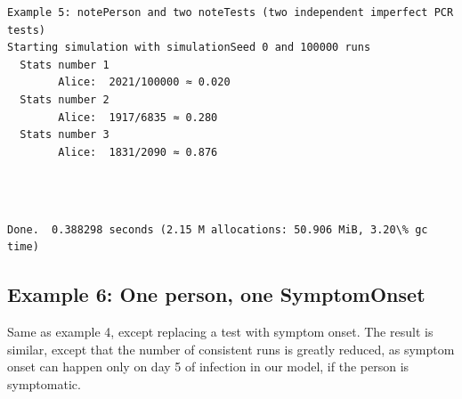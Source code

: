 \documentclass[11pt]{article}
\begin{document}
    \begin{Verbatim}[commandchars=\\\{\}]
Example 5: notePerson and two noteTests (two independent imperfect PCR tests)
Starting simulation with simulationSeed 0 and 100000 runs
  Stats number 1
        Alice:  2021/100000 ≈ 0.020
  Stats number 2
        Alice:  1917/6835 ≈ 0.280
  Stats number 3
        Alice:  1831/2090 ≈ 0.876
    \end{Verbatim}

    \begin{center}
    \end{center}
    { \hspace*{\fill} \\}
    
    \begin{Verbatim}[commandchars=\\\{\}]

Done.  0.388298 seconds (2.15 M allocations: 50.906 MiB, 3.20\% gc time)
    \end{Verbatim}
\newpage
    \hypertarget{example-6-one-person-one-symptomonset}{%
\subsection{Example 6: One person, one
SymptomOnset}\label{example-6-one-person-one-symptomonset}}

Same as example 4, except replacing a test with symptom onset. The
result is similar, except that the number of consistent runs is greatly
reduced, as symptom onset can happen only on day 5 of infection in our
model, if the person is symptomatic.
\end{document}

